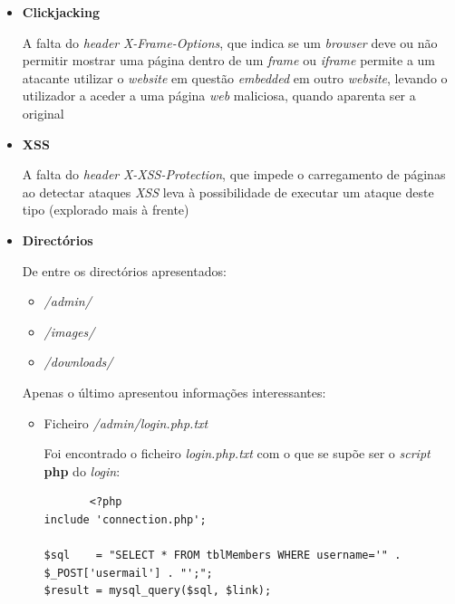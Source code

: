 \documentclass[10pt,english]{article}
\begin{document}
    \begin{itemize}
    
    \item {\textbf{Clickjacking}}
    
    \par A falta do \textit{header} \textit{X-Frame-Options}, que indica se um \textit{browser} deve ou não permitir mostrar uma página dentro de um \textit{frame} ou \textit{iframe} permite a um atacante utilizar o \textit{website} em questão \textit{embedded} em outro \textit{website}, levando o utilizador a aceder a uma página \textit{web} maliciosa, quando aparenta ser a original
    
     \item {\textbf{XSS}}
    
    \par A falta do \textit{header} \textit{X-XSS-Protection}, que impede o carregamento de páginas ao detectar ataques \textit{XSS} leva à possibilidade de executar um ataque deste tipo (explorado mais à frente)
    
     \item {\textbf{Directórios}}
    
    \par De entre os directórios apresentados:
    
    \begin{itemize}
        \item \textit{/admin/}
        \item \textit{/images/}
        \item \textit{/downloads/}
    \end{itemize}
    
    \par Apenas o último apresentou informações interessantes:
    

    \begin{itemize}
       
    \item {Ficheiro \textit{/admin/login.php.txt}}
   
    \par Foi encontrado o ficheiro \textit{login.php.txt} com o que se supõe ser o \textit{script} \textbf{php} do \textit{login}:
    
    \begin{lstlisting}
       <?php
include 'connection.php';

$sql    = "SELECT * FROM tblMembers WHERE username='" . $_POST['usermail'] . "';";
$result = mysql_query($sql, $link);


\end{lstlisting}
\end{itemize}
\end{itemize}
\end{document}
